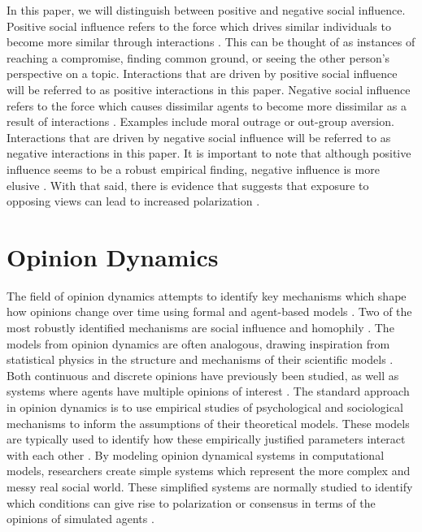 \documentclass[11pt]{article}
\begin{document}
In this paper, we will distinguish between positive and negative social influence. Positive social influence refers to the force which drives similar individuals to become more similar through interactions \cite{flache_models_2017,levin_dynamics_2021}. 
This can be thought of as instances of reaching a compromise, finding common ground, or seeing the other person's perspective on a topic. Interactions that are driven by positive social influence will be referred to as positive interactions in this paper. Negative social influence refers to the force which causes dissimilar agents to become more dissimilar as a result of interactions \cite{flache_models_2017}. 
Examples include moral outrage or out-group aversion. Interactions that are driven by negative social influence will be referred to as negative interactions in this paper. It is important to note that although positive influence seems to be a robust empirical finding, negative influence is more elusive \cite{flache_models_2017,takacs_is_2014,turner_paths_2018}. 
With that said, there is evidence that suggests that exposure to opposing views can lead to increased polarization \cite{bail_exposure_2018, hilmert2006positive, cikara2014neuroscience}.

\section{Opinion Dynamics}
The field of opinion dynamics attempts to identify key mechanisms which shape how opinions change over time using formal and agent-based models \cite{flache_models_2017,flache_between_2018,noorazar_classical_2020}. Two of the most robustly identified mechanisms are social influence and homophily \cite{flache_models_2017}. The models from opinion dynamics are often analogous, drawing inspiration from statistical physics in the structure and mechanisms of their scientific models \cite{galesic_integrating_2021}. Both continuous and discrete opinions have previously been studied, as well as systems where agents have multiple opinions of interest \cite{flache_models_2017}. The standard approach in opinion dynamics is to use empirical studies of psychological and sociological mechanisms to inform the assumptions of their theoretical models. These models are typically used to identify how these empirically justified parameters interact with each other  \cite{baumann2021modeling,chacoma_opinion_2015,flache_models_2017,friedkin_social_1990,noorazar_classical_2020,spears_social_2021,turner_paths_2018}. By modeling opinion dynamical systems in computational models, researchers create simple systems which represent the more complex and messy real social world. These simplified systems are normally studied to identify which conditions can give rise to polarization or consensus in terms of the opinions of simulated agents \cite{flache_models_2017}.
\end{document}
